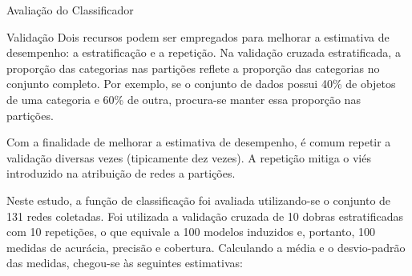 \begin{section}{Avaliação do Classificador}
\begin{subsection}{Validação}
		Dois recursos podem ser empregados para melhorar a estimativa de desempenho: a estratificação e a repetição. Na validação cruzada estratificada, a proporção das categorias nas partições reflete a proporção das categorias no conjunto completo. Por exemplo, se o conjunto de dados possui 40\% de objetos de uma categoria e 60\% de outra, procura-se manter essa proporção nas partições. 

		Com a finalidade de melhorar a estimativa de desempenho, é comum repetir a validação diversas vezes (tipicamente dez vezes). A repetição mitiga o viés introduzido na atribuição de redes a partições.

		Neste estudo, a função de classificação foi avaliada utilizando-se o conjunto de 131 redes coletadas. Foi utilizada a validação cruzada de 10 dobras estratificadas com 10 repetições, o que equivale a 100 modelos induzidos e, portanto, 100 medidas de acurácia, precisão e cobertura. Calculando a média e o desvio-padrão das medidas, chegou-se às seguintes estimativas:




% 



\end{subsection}
\end{section}

